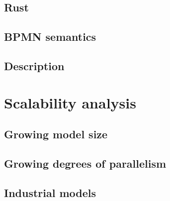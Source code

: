\documentclass[runningheads]{llncs}
\begin{document}
\subsection{Rust}

\subsection{BPMN semantics}

\subsection{Description}
\cite{camundaservicesgmbhBpmnjs2024}


\section{Scalability analysis}

\subsection{Growing model size}

\subsection{Growing degrees of parallelism}

\subsection{Industrial models}
\end{document}
